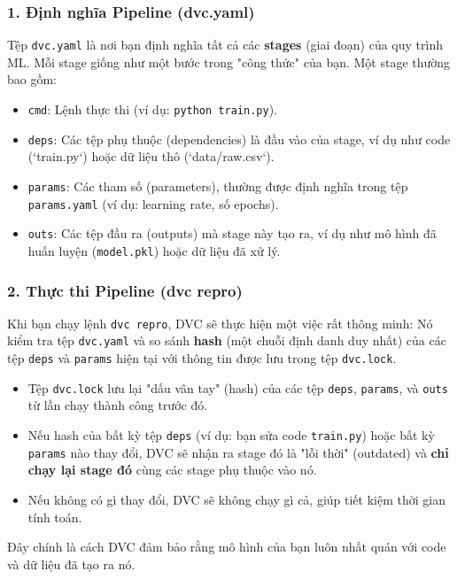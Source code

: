 \documentclass[11pt]{article}
\begin{document}
\subsubsection{1. Định nghĩa Pipeline (dvc.yaml)}
Tệp \texttt{dvc.yaml} là nơi bạn định nghĩa tất cả các \textbf{stages} (giai đoạn) của quy trình ML. Mỗi stage giống như một bước trong "công thức" của bạn. Một stage thường bao gồm:
\begin{itemize}
    \item \texttt{cmd}: Lệnh thực thi (ví dụ: \texttt{python train.py}).
    \item \texttt{deps}: Các tệp phụ thuộc (dependencies) là đầu vào của stage, ví dụ như code (`train.py`) hoặc dữ liệu thô (`data/raw.csv`).
    \item \texttt{params}: Các tham số (parameters), thường được định nghĩa trong tệp \texttt{params.yaml} (ví dụ: learning rate, số epochs).
    \item \texttt{outs}: Các tệp đầu ra (outputs) mà stage này tạo ra, ví dụ như mô hình đã huấn luyện (\texttt{model.pkl}) hoặc dữ liệu đã xử lý.
\end{itemize}

\subsubsection{2. Thực thi Pipeline (dvc repro)}
Khi bạn chạy lệnh \texttt{dvc repro}, DVC sẽ thực hiện một việc rất thông minh:
Nó kiểm tra tệp \texttt{dvc.yaml} và so sánh \textbf{hash} (một chuỗi định danh duy nhất) của các tệp \texttt{deps} và \texttt{params} hiện tại với thông tin được lưu trong tệp \texttt{dvc.lock}.

\begin{itemize}
    \item Tệp \texttt{dvc.lock} lưu lại "dấu vân tay" (hash) của các tệp \texttt{deps}, \texttt{params}, và \texttt{outs} từ lần chạy thành công trước đó.
    \item Nếu hash của bất kỳ tệp \texttt{deps} (ví dụ: bạn sửa code \texttt{train.py}) hoặc bất kỳ \texttt{params} nào thay đổi, DVC sẽ nhận ra stage đó là "lỗi thời" (outdated) và \textbf{chỉ chạy lại stage đó} cùng các stage phụ thuộc vào nó.
    \item Nếu không có gì thay đổi, DVC sẽ không chạy gì cả, giúp tiết kiệm thời gian tính toán.
\end{itemize}
Đây chính là cách DVC đảm bảo rằng mô hình của bạn luôn nhất quán với code và dữ liệu đã tạo ra nó.
\end{document}
